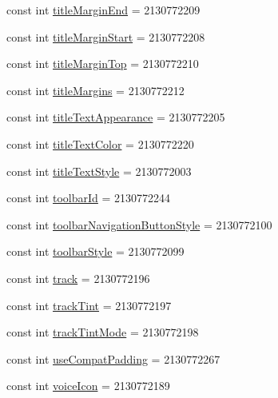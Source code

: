 \begin{CompactItemize}
\item 
const int \hyperlink{class__2doo_1_1_droid_1_1_resource_1_1_attribute_4d372eac635ff9735220f04fcf98a518}{titleMarginEnd} = 2130772209
\item 
const int \hyperlink{class__2doo_1_1_droid_1_1_resource_1_1_attribute_3598a288ee5096fd03f3f74dcb24e462}{titleMarginStart} = 2130772208
\item 
const int \hyperlink{class__2doo_1_1_droid_1_1_resource_1_1_attribute_21a0247af61b502887e4f03c8fdb8f30}{titleMarginTop} = 2130772210
\item 
const int \hyperlink{class__2doo_1_1_droid_1_1_resource_1_1_attribute_2daa3a98caebc5b0a440f6570fbb9b1c}{titleMargins} = 2130772212
\item 
const int \hyperlink{class__2doo_1_1_droid_1_1_resource_1_1_attribute_6de51b5b7f6293949d19f861edd10039}{titleTextAppearance} = 2130772205
\item 
const int \hyperlink{class__2doo_1_1_droid_1_1_resource_1_1_attribute_7faadf27a51783f1d33018efd4200ded}{titleTextColor} = 2130772220
\item 
const int \hyperlink{class__2doo_1_1_droid_1_1_resource_1_1_attribute_bb14f4a9328498a1dbd645473b95c0d0}{titleTextStyle} = 2130772003
\item 
const int \hyperlink{class__2doo_1_1_droid_1_1_resource_1_1_attribute_069cb67a1ac43cc7bce7afbe251f6fd7}{toolbarId} = 2130772244
\item 
const int \hyperlink{class__2doo_1_1_droid_1_1_resource_1_1_attribute_5742d7a45606f59a40e34eb41781390b}{toolbarNavigationButtonStyle} = 2130772100
\item 
const int \hyperlink{class__2doo_1_1_droid_1_1_resource_1_1_attribute_28d68d943d944c7665cc2ae3421f0ef0}{toolbarStyle} = 2130772099
\item 
const int \hyperlink{class__2doo_1_1_droid_1_1_resource_1_1_attribute_c7f57f4a84dcc71afa8dc8cefd940991}{track} = 2130772196
\item 
const int \hyperlink{class__2doo_1_1_droid_1_1_resource_1_1_attribute_5af75c0b1bfc3dddb71667523b97baab}{trackTint} = 2130772197
\item 
const int \hyperlink{class__2doo_1_1_droid_1_1_resource_1_1_attribute_715dcb935f5123a786e4c18451df2292}{trackTintMode} = 2130772198
\item 
const int \hyperlink{class__2doo_1_1_droid_1_1_resource_1_1_attribute_4f9c8913cc01c247ae712dbafe83299f}{useCompatPadding} = 2130772267
\item 
const int \hyperlink{class__2doo_1_1_droid_1_1_resource_1_1_attribute_9cbeef149e7d4cbf9d40e837a790c522}{voiceIcon} = 2130772189

\end{CompactItemize}
